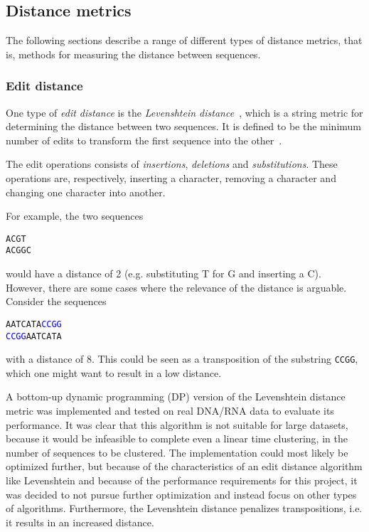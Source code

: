 \subsection{Distance metrics}

The following sections describe a range of different types of distance metrics,
that is, methods for measuring the distance between sequences.

\subsubsection{Edit distance}\label{sec:edit_distance}

One type of \emph{edit distance} is the \emph{Levenshtein
distance}~\cite{levenshtein}, which is a string metric for determining the
distance between two sequences. It is defined to be the minimum number of
edits to transform the first sequence into the other~\cite[p.~52]{dong}.

The edit operations consists of \emph{insertions}, \emph{deletions} and
\emph{substitutions}. These operations are, respectively, inserting a
character, removing a character and changing one character into another.

For example, the two sequences
\begin{center}
  \texttt{ACGT} \\
  \texttt{ACGGC}
\end{center}
would have a distance of \num{2} (e.g. substituting T for G and inserting a C).
However, there are some cases where the relevance of the distance is arguable.
Consider the sequences
\begin{center}
  \texttt{AATCATA\textcolor{blue}{CCGG}} \\
  \texttt{\textcolor{blue}{CCGG}AATCATA}
\end{center}
with a distance of \num{8}. This could be seen as a transposition of the
substring \texttt{CCGG}, which one might want to result in a low distance.

A bottom-up dynamic programming (DP) version of the Levenshtein distance metric
was implemented and tested on real DNA/RNA data to evaluate its performance. It
was clear that this algorithm is not suitable for large datasets, because it
would be infeasible to complete even a linear time clustering, in the number of
sequences to be clustered. The implementation could most likely be optimized
further, but because of the characteristics of an edit distance algorithm like
Levenshtein and because of the performance requirements for this project, it
was decided to not pursue further optimization and instead focus on other types
of algorithms. Furthermore, the Levenshtein distance penalizes transpositions,
i.e. it results in an increased distance.

